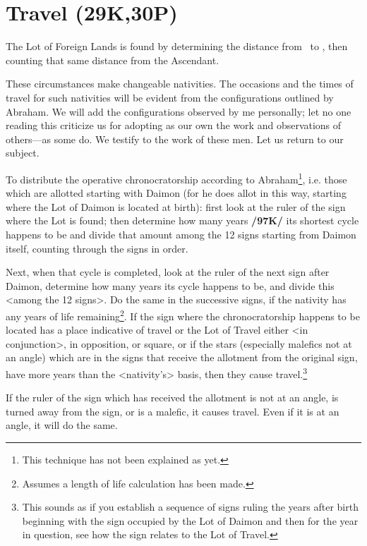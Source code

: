 \section{Travel (29K,30P)}
The Lot of Foreign  Lands is found by determining the distance from \Saturn\, to \Mars, then counting that same distance from the Ascendant. 

These circumstances make changeable nativities. The occasions
and the times of travel for such nativities will be evident from the configurations outlined by Abraham. We will add the configurations observed by me personally; let no one reading this criticize us for adopting as our own the work and observations of others—as some do. We testify to the work of these men. Let us return to our subject.

To distribute the operative chronocratorship according to Abraham\footnote{This technique has not been explained as yet.}, i.e. those which are allotted starting with Daimon (for he does allot in this way, starting where the Lot of Daimon is located at birth): first look at the ruler of the sign where the Lot is found; then determine how many years \textbf{/97K/} its shortest cycle happens to be and divide that amount among the 12 signs starting from Daimon itself, counting through the signs in order.

Next, when that cycle is completed, look at the ruler of the next sign after Daimon, determine how many years its cycle happens to be, and divide this <among the 12 signs>. Do the same in the successive signs, if the nativity has any years of life remaining\footnote{Assumes a length of life calculation has been made.}. If the sign where the chronocratorship happens to be located has a place indicative of travel or the Lot of Travel either <in conjunction>, in opposition, or square, or if the stars (especially malefics not at an angle) which are in the signs that receive the allotment from the original sign, have more years than the <nativity’s> basis, then they cause travel.\footnote{This sounds as if you establish a sequence of signs ruling the years after birth beginning with the sign occupied by the Lot of Daimon and then for the year in question, see how the sign relates to the Lot of Travel.}

If the ruler of the sign which has received the allotment is not at an angle, is turned away from the sign, or is a malefic, it causes travel. Even if it is at an angle, it will do the same. 

